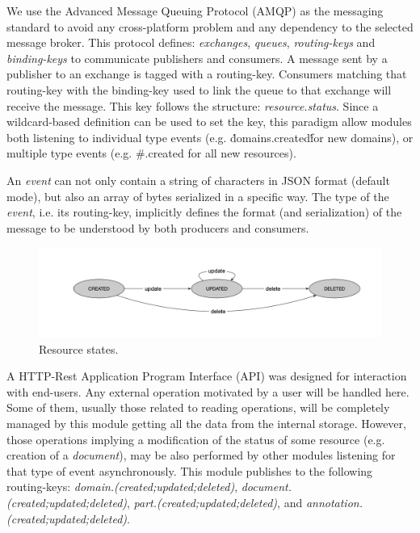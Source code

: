 We use the Advanced Message Queuing Protocol (AMQP) as the messaging standard to avoid any cross-platform problem and any dependency to the selected message broker. This protocol defines: \textit{exchanges}, \textit{queues}, \textit{routing-keys} and \textit{binding-keys} to communicate publishers and consumers. A message sent by a publisher to an exchange is tagged with a routing-key. Consumers matching that routing-key with the binding-key used to link the queue to that exchange will receive the message. This key follows the structure: \textit{resource.status}. Since a wildcard-based definition can be used to set the key, this paradigm allow modules both listening to individual type events (e.g. \'domains.created\' for new domains), or multiple type events (e.g. \#.created for all new resources).

An \textit{event} can not only contain a string of characters in JSON format (default mode), but also an array of bytes serialized in a specific way. The type of the \textit{event}, i.e. its routing-key, implicitly defines the format (and serialization) of the message to be understood by both producers and consumers. 


\begin{figure}
  \includegraphics[scale=0.3]{resource-states}
  \caption{Resource states.}
  \label{fig:librairy-states}
\end{figure}

A HTTP-Rest Application Program Interface (API) was designed for interaction with end-users. Any external operation motivated by a user will be handled here. Some of them, usually those related to reading operations, will be completely managed by this module getting all the data from the internal storage. However, those operations implying a modification of the status of some resource (e.g. creation of a \textit{document}), may be also performed by other modules listening for that type of event asynchronously. This module publishes to the following routing-keys: \textit{domain.(created;updated;deleted)}, \textit{document.(created;updated;deleted)}, \textit{part.(created;updated;deleted)}, and \textit{annotation.(created;updated;deleted)}.

